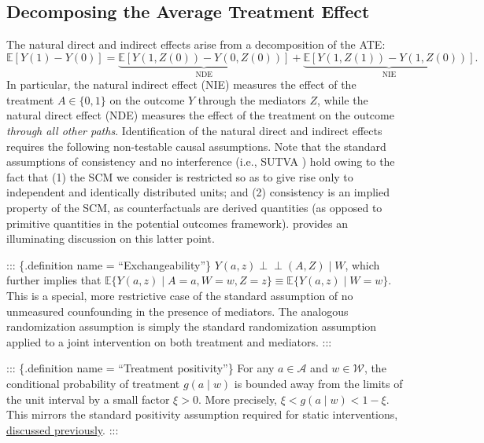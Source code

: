 \documentclass[
  12pt, krantz2,
]{krantz}
\newcommand{\E}{\mathbb{E}}
\newcommand{\1}{\mathbbm{1}}
\newcommand{\indep}{\mbox{$\perp\!\!\!\perp$}}
\theoremstyle{definition}
\theoremstyle{definition}
\theoremstyle{definition}
\theoremstyle{definition}
\theoremstyle{remark}
\begin{document}
\hypertarget{decomposing-the-average-treatment-effect}{%
\subsection{Decomposing the Average Treatment Effect}\label{decomposing-the-average-treatment-effect}}

The natural direct and indirect effects arise from a decomposition of the ATE:
\begin{equation*}
  \E[Y(1) - Y(0)] =
    \underbrace{\E[Y(1, Z(0)) - Y(0, Z(0))]}_{\text{NDE}} +
    \underbrace{\E[Y(1, Z(1)) - Y(1, Z(0))]}_{\text{NIE}}.
\end{equation*}
In particular, the natural indirect effect (NIE) measures the effect of the
treatment \(A \in \{0, 1\}\) on the outcome \(Y\) through the mediators \(Z\), while
the natural direct effect (NDE) measures the effect of the treatment on the
outcome \emph{through all other paths}. Identification of the natural direct and
indirect effects requires the following non-testable causal assumptions. Note
that the standard assumptions of consistency and no interference (i.e., SUTVA
\citep{rubin1978bayesian, rubin1980randomization}) hold owing to the fact that (1)
the SCM we consider is restricted so as to give rise only to independent and
identically distributed units; and (2) consistency is an implied property of
the SCM, as counterfactuals are derived quantities (as opposed to primitive
quantities in the potential outcomes framework). \citet{pearl2010brief} provides an
illuminating discussion on this latter point.

::: \{.definition name = ``Exchangeability''\}
\(Y(a, z) \indep (A, Z) \mid W\), which further implies that \(\E\{Y(a, z) \mid A=a, W=w, Z=z\} \equiv \E\{Y(a, z) \mid W=w\}\). This is a special, more
restrictive case of the standard assumption of no unmeasured counfounding in the
presence of mediators. The analogous randomization assumption is simply the
standard randomization assumption applied to a joint intervention on both
treatment and mediators.
:::

::: \{.definition name = ``Treatment positivity''\}
For any \(a \in \mathcal{A}\) and \(w \in \mathcal{W}\), the conditional probability
of treatment \(g(a \mid w)\) is bounded away from the limits of the unit interval
by a small factor \(\xi > 0\). More precisely, \(\xi < g(a \mid w) < 1 - \xi\). This
mirrors the standard positivity assumption required for static interventions,
\protect\hyperlink{tmle3}{discussed previously}.
:::
\end{document}
